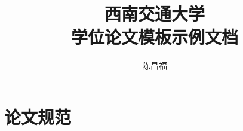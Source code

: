 \documentclass[doctor]{swjtuthesis}
\title{西南交通大学\\学位论文模板示例文档}
\author{陈昌福}
\begin{document}
\maketitle

%

\frontmatter

\tableofcontents
\listoffigures
\listoftables
% 

\mainmatter






\appendix
\chapter{论文规范}

\backmatter


\end{document}
